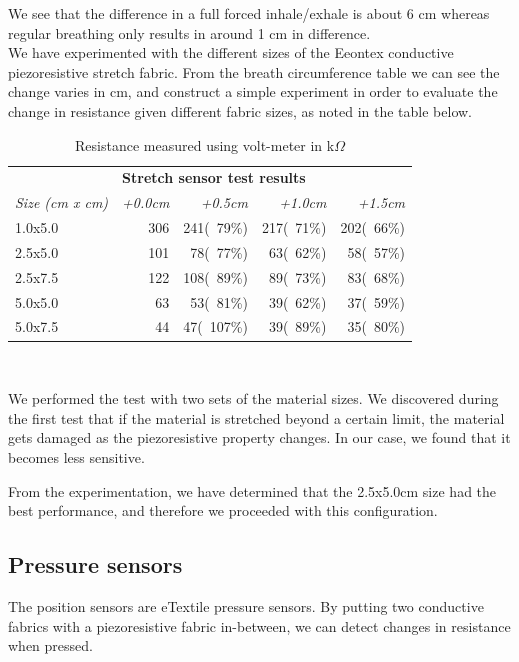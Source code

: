 \documentclass{sigchi-ext}
\begin{document}
We see that the difference in a full forced inhale/exhale is about 6 cm whereas regular
breathing only results in around 1 cm in difference.\\
We have experimented with the different sizes of the Eeontex conductive piezoresistive
stretch fabric. From the breath circumference table we can see the change varies in cm, and construct a simple experiment in order to evaluate the change in resistance given
different fabric sizes, as noted in the table below.
\begin{table}[H]
  \centering
  \begin{tabular}{l r r r r}
    & \multicolumn{4}{l}{\small{\textbf{Stretch sensor test results}}} \\
    \cmidrule(r){2-4}
    {\small\textit{Size (cm x cm)}}
    & {\small \textit{+0.0cm}}
    & {\small \textit{+0.5cm}}
    & {\small \textit{+1.0cm}}
    & {\small \textit{+1.5cm}} \\
    \midrule
    1.0x5.0    & 306 & 241(~79\%) & 217(~71\%) & 202(~66\%)\\
    2.5x5.0    & 101 & 78(~77\%)  & 63(~62\%)  & 58(~57\%) \\
    2.5x7.5    & 122 & 108(~89\%) & 89(~73\%)  & 83(~68\%) \\
    5.0x5.0    & 63  & 53(~81\%)  & 39(~62\%)  & 37(~59\%) \\
    5.0x7.5    & 44  & 47(~107\%)  & 39(~89\%)  & 35(~80\%) \\
  \end{tabular}
  \caption{Resistance measured using volt-meter in k$\Omega$}~\label{tab:stretch-test}
\end{table}
We performed the test with two sets of the material sizes.
We discovered during the first test that if the material
is stretched beyond a certain limit, the material gets
damaged as the piezoresistive property changes. In our case,
we found that it becomes less sensitive.

From the experimentation, we have determined that the 2.5x5.0cm size had the best performance, and therefore we proceeded with this
configuration.

\clearpage

\subsection{Pressure sensors}
The position sensors are eTextile pressure sensors. By putting two conductive
fabrics with a piezoresistive fabric in-between, we can detect changes in resistance when pressed.
\end{document}
